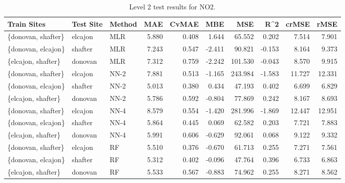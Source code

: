 \begin{table}[h]
\begin{tabular}{lllrrrrrrr}
\toprule
 Train Sites & Test Site & Method &   MAE &  CvMAE &       MBE &     MSE &   R\textasciicircum2 &  crMSE &   rMSE \\
\midrule
\{donovan, shafter\} & elcajon & MLR & 5.880 & 0.408 & 1.644 & 65.552 & 0.202 & 7.514 & 7.901\\
\{donovan, elcajon\} & shafter & MLR & 7.243 & 0.547 & -2.411 & 90.821 & -0.153 & 8.164 & 9.373\\
\{elcajon, shafter\} & donovan & MLR & 7.312 & 0.759 & -2.242 & 101.530 & -0.043 & 8.570 & 9.915\\
\{donovan, shafter\} & elcajon & NN-2 & 7.881 & 0.513 & -1.165 & 243.984 & -1.583 & 11.727 & 12.331\\
\{donovan, elcajon\} & shafter & NN-2 & 5.013 & 0.380 & 0.434 & 47.193 & 0.402 & 6.699 & 6.829\\
\{elcajon, shafter\} & donovan & NN-2 & 5.786 & 0.592 & -0.804 & 77.869 & 0.242 & 8.167 & 8.693\\
\{donovan, shafter\} & elcajon & NN-4 & 8.579 & 0.554 & -1.420 & 281.996 & -1.869 & 12.447 & 12.951\\
\{donovan, elcajon\} & shafter & NN-4 & 5.864 & 0.445 & 0.069 & 62.582 & 0.203 & 7.721 & 7.883\\
\{elcajon, shafter\} & donovan & NN-4 & 5.991 & 0.606 & -0.629 & 92.061 & 0.068 & 9.122 & 9.332\\
\{donovan, shafter\} & elcajon & RF & 5.510 & 0.376 & -0.670 & 61.713 & 0.255 & 7.271 & 7.561\\
\{donovan, elcajon\} & shafter & RF & 5.312 & 0.402 & -0.096 & 47.764 & 0.396 & 6.733 & 6.863\\
\{elcajon, shafter\} & donovan & RF & 5.533 & 0.567 & -0.883 & 74.962 & 0.255 & 8.271 & 8.562\\
\bottomrule
\end{tabular}
\caption{Level 2 test results for NO2.}
\end{table}
